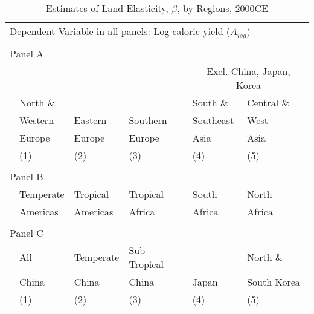 \documentclass[11pt]{article}
\begin{document}
\clearpage
\begin{table}[!htb]
\begin{center}
\caption{Estimates of Land Elasticity, $\beta$, by Regions, 2000CE}
\label{TAB_beta_subregion}
{\footnotesize
\begin{tabularx}{\textwidth}{lXXXXX}
\midrule
\multicolumn{6}{l}{Dependent Variable in all panels: Log caloric yield ($A_{isg}$)} \\ \\
\multicolumn{6}{l}{Panel A} \\
 &          &         &             &  \multicolumn{2}{c}{Excl. China, Japan, Korea} \\ \cmidrule(lr){5-6}
 & North \& &         &              & South \&  & Central \&             \\
 & Western  & Eastern & Southern     & Southeast & West        \\
 & Europe   & Europe  & Europe       & Asia      & Asia      \\
 & (1) & (2) & (3) & (4) & (5) \\
\midrule

\midrule
\\
\multicolumn{6}{l}{Panel B} \\
 & Temperate & Tropical  & Tropical & South    & North    \\
 & Americas  & Americas  & Africa   & Africa   & Africa     \\
\midrule

\midrule
\\
\multicolumn{6}{l}{Panel C} \\
 & All& Temperate & Sub-Tropical & & North \& \\
 & China & China  & China & Japan & South Korea  \\
 & (1) & (2) & (3) & (4) & (5) \\
\midrule

\midrule

\end{tabularx}
}
\end{center}
\vspace{-.5cm}
\end{table}
\end{document}
